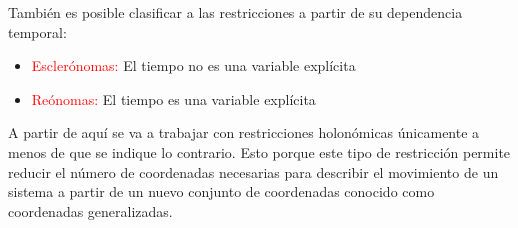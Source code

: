 \documentclass[/home/hernan/Documentos/Apuntes_mecanica_teorica/main.tex]{subfiles}
\begin{document}
\begin{definition}
        También es posible clasificar a las restricciones a partir de su dependencia temporal:

        \begin{itemize}
            \item \textcolor{red}{Esclerónomas:} El tiempo no es una variable explícita
            \item \textcolor{red}{Reónomas:} El tiempo es una variable explícita
        \end{itemize}

    \end{definition}

    A partir de aquí se va a trabajar con restricciones holonómicas únicamente a menos de que se indique lo contrario. Esto porque este tipo de restricción permite reducir el número de coordenadas necesarias para describir el movimiento de un sistema a partir de un nuevo conjunto de coordenadas conocido como coordenadas generalizadas.
\end{document}
